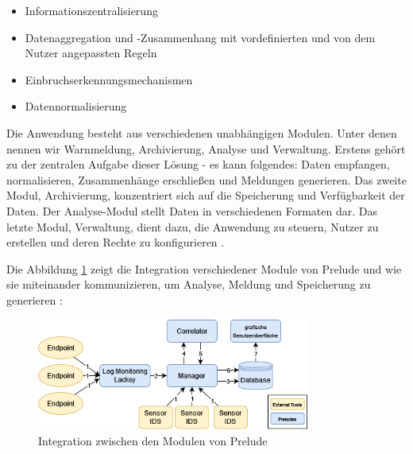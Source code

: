 \begin{itemize}[noitemsep]
   \item	Informationszentralisierung
   \item	Datenaggregation und -Zusammenhang mit vordefinierten und von dem Nutzer angepassten Regeln
   \item	Einbruchserkennungsmechanismen
   \item	Datennormalisierung
\end{itemize}

Die Anwendung besteht aus verschiedenen unabhängigen Modulen. Unter denen nennen wir Warnmeldung, Archivierung, Analyse und Verwaltung. Erstens gehört zu der zentralen Aufgabe dieser Lösung - es kann folgendes: Daten empfangen, normalisieren, Zusammenhänge erschließen und Meldungen generieren. Das zweite Modul, Archivierung, konzentriert sich auf die Speicherung und Verfügbarkeit der Daten. Der Analyse-Modul stellt Daten in verschiedenen Formaten dar. Das letzte Modul, Verwaltung, dient dazu, die Anwendung zu steuern, Nutzer zu erstellen und deren Rechte zu konfigurieren \citep{EC_Prelude}.

Die Abbildung \ref{fig:Module_preludes} zeigt die Integration verschiedener Module von Prelude und wie sie miteinander kommunizieren, um Analyse, Meldung und Speicherung zu generieren \citep{Prelude_MU}:

\begin{figure}[H]
   \centering
   \includegraphics[width=0.8\textwidth]{assets/Prelude_module.drawio.png}
   \caption[Integration zwischen den Modulen von Prelude ]
   {Integration zwischen den Modulen von Prelude }
   \label{fig:Module_preludes}
   \centering
\end{figure}


